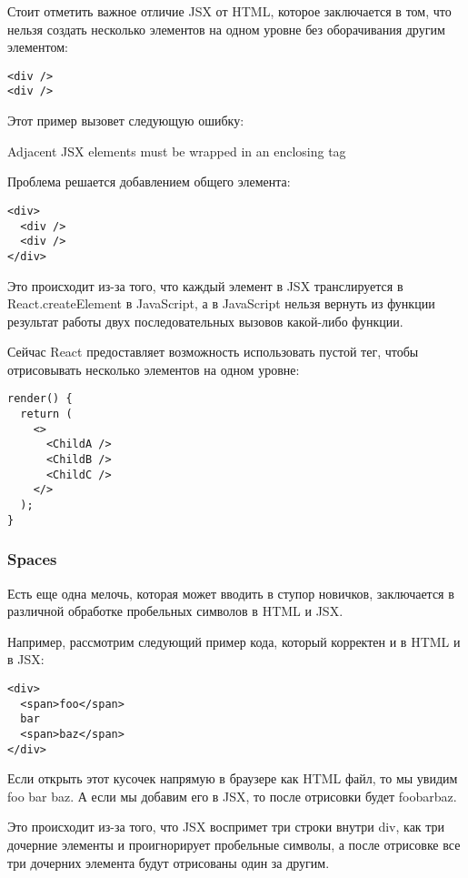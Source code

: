 Стоит отметить важное отличие JSX от HTML, которое заключается в том, что нельзя создать несколько элементов на одном уровне без оборачивания другим элементом:

\begin{lstlisting}
<div />
<div />
\end{lstlisting}

Этот пример вызовет следующую ошибку:

Adjacent JSX elements must be wrapped in an enclosing tag

Проблема решается добавлением общего элемента:

\begin{lstlisting}
<div> 
  <div />
  <div />
</div>
\end{lstlisting}
   
Это происходит из-за того, что каждый элемент в JSX транслируется в React.createElement в JavaScript, а в JavaScript нельзя вернуть из функции результат работы двух последовательных вызовов какой-либо функции.

Сейчас React предоставляет возможность использовать пустой тег, чтобы отрисовывать несколько элементов на одном уровне:

\begin{lstlisting}
render() {
  return (
    <>
      <ChildA />
      <ChildB />
      <ChildC />
    </>
  );
}
\end{lstlisting}
  
\subsubsection{Spaces}   

Есть еще одна мелочь, которая может вводить в ступор новичков, заключается в различной обработке пробельных символов в HTML и JSX.

Например, рассмотрим следующий пример кода, который корректен и в HTML и в JSX:

\begin{lstlisting}
<div>
  <span>foo</span>
  bar
  <span>baz</span>
</div>
\end{lstlisting}

Если открыть этот кусочек напрямую в браузере как HTML файл, то мы увидим foo bar baz. А если мы добавим его в JSX, то после отрисовки будет foobarbaz.

Это происходит из-за того, что JSX воспримет три строки внутри div, как три дочерние элементы и проигнорирует пробельные символы, а после отрисовке все три дочерних элемента будут отрисованы один за другим.

